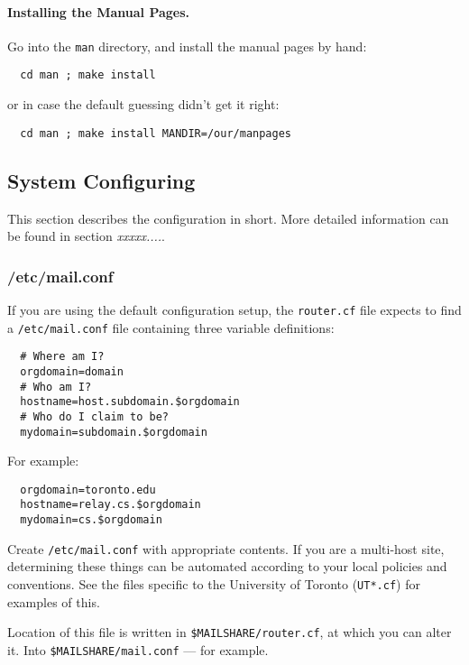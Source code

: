 \paragraph{Installing the Manual Pages.}%
%

Go into the {\tt man} directory, and install the manual pages by hand:
\begin{verbatim}
  cd man ; make install
\end{verbatim}

or in case the default guessing didn't get it right:
\begin{verbatim}
  cd man ; make install MANDIR=/our/manpages
\end{verbatim}

\subsection{System Configuring}%
%
%

This section describes the configuration in short. More detailed information 
can be found in section {\em xxxxx....\/}.


\subsubsection{/etc/mail.conf}%
%

If you are using the default configuration setup, the {\tt router.cf} file
expects to find a {\tt /etc/mail.conf} file containing three variable
definitions:
\begin{verbatim}
  # Where am I?
  orgdomain=domain
  # Who am I?
  hostname=host.subdomain.$orgdomain
  # Who do I claim to be?
  mydomain=subdomain.$orgdomain
\end{verbatim}

For example:
\begin{verbatim}
  orgdomain=toronto.edu
  hostname=relay.cs.$orgdomain
  mydomain=cs.$orgdomain
\end{verbatim}

Create {\tt /etc/mail.conf} with appropriate contents.  If you are a
multi-host site, determining these things can be automated according
to your local policies and conventions.  See the files specific to
the University of Toronto ({\tt UT*.cf}) for examples of this.

Location of this file is written in {\tt \$MAILSHARE/router.cf}, at which
you can alter it. Into {\tt \$MAILSHARE/mail.conf} --- for example.


